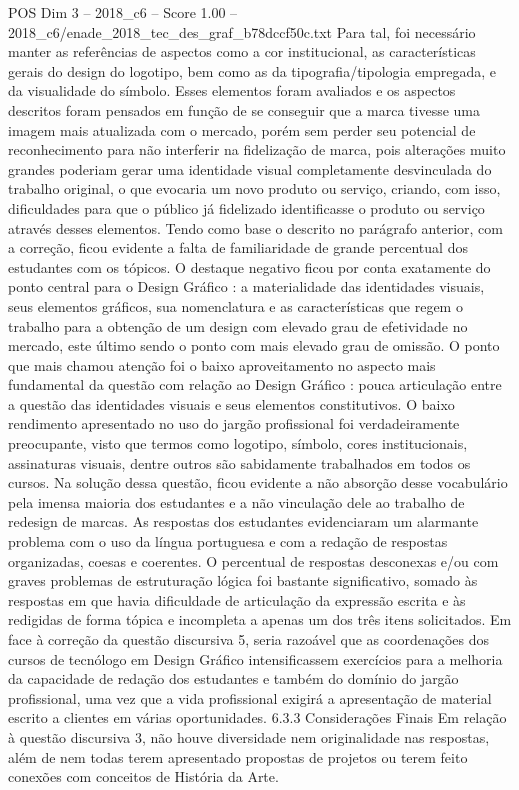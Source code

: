 \begin{textsample}{POS Dim 3 – 2018\_c6 – Score 1.00 – 2018\_c6/enade\_2018\_tec\_des\_graf\_b78dccf50c.txt}
Para tal, foi necessário manter as referências de aspectos como a cor institucional, as características gerais do design do logotipo, bem como as da tipografia/tipologia empregada, e da visualidade do símbolo.
Esses elementos foram avaliados e os aspectos descritos foram pensados em função de se conseguir que a marca tivesse uma imagem mais atualizada com o mercado, porém sem perder seu potencial de reconhecimento para não interferir na fidelização de marca, pois alterações muito grandes poderiam gerar uma identidade visual completamente desvinculada do trabalho original, o que evocaria um novo produto ou serviço, criando, com isso, dificuldades para que o público já fidelizado identificasse o produto ou serviço através desses elementos.
Tendo como base o descrito no parágrafo anterior, com a correção, ficou evidente a falta de familiaridade de grande percentual dos estudantes com os tópicos.
O destaque negativo ficou por conta exatamente do ponto central para o Design Gráfico : a materialidade das identidades visuais, seus elementos gráficos, sua nomenclatura e as características que regem o trabalho para a obtenção de um design com elevado grau de efetividade no mercado, este último sendo o ponto com mais elevado grau de omissão.
O ponto que mais chamou atenção foi o baixo aproveitamento no aspecto mais fundamental da questão com relação ao Design Gráfico : pouca articulação entre a questão das identidades visuais e seus elementos constitutivos.
O baixo rendimento apresentado no uso do jargão profissional foi verdadeiramente preocupante, visto que termos como logotipo, símbolo, cores institucionais, assinaturas visuais, dentre outros são sabidamente trabalhados em todos os cursos.
Na solução dessa questão, ficou evidente a não absorção desse vocabulário pela imensa maioria dos estudantes e a não vinculação dele ao trabalho de redesign de marcas.
As respostas dos estudantes evidenciaram um alarmante problema com o uso da língua portuguesa e com a redação de respostas organizadas, coesas e coerentes.
O percentual de respostas desconexas e/ou com graves problemas de estruturação lógica foi bastante significativo, somado às respostas em que havia dificuldade de articulação da expressão escrita e às redigidas de forma tópica e incompleta a apenas um dos três itens solicitados.
Em face à correção da questão discursiva 5, seria razoável que as coordenações dos cursos de tecnólogo em Design Gráfico intensificassem exercícios para a melhoria da capacidade de redação dos estudantes e também do domínio do jargão profissional, uma vez que a vida profissional exigirá a apresentação de material escrito a clientes em várias oportunidades. 6.3.3 Considerações Finais Em relação à questão discursiva 3, não houve diversidade nem originalidade nas respostas, além de nem todas terem apresentado propostas de projetos ou terem feito conexões com conceitos de História da Arte.

\end{textsample}

